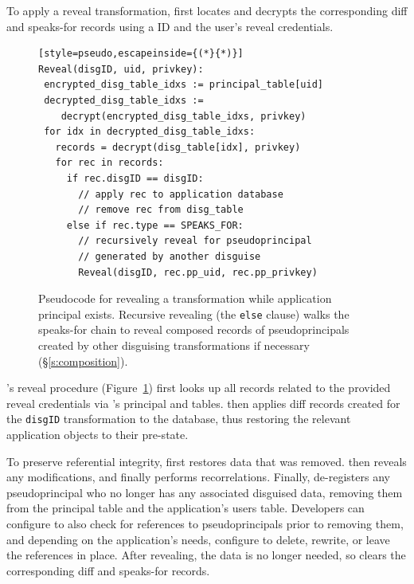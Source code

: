 %
To apply a reveal transformation, \sys first locates and decrypts the
corresponding diff and speaks-for records using a \xx ID and the user’s reveal
credentials.
%

\begin{figure}[t]
  \small
\begin{lstlisting}[style=pseudo,escapeinside={(*}{*)}]
Reveal(disgID, uid, privkey):
 encrypted_disg_table_idxs := principal_table[uid]
 decrypted_disg_table_idxs :=
    decrypt(encrypted_disg_table_idxs, privkey)
 for idx in decrypted_disg_table_idxs:
   records = decrypt(disg_table[idx], privkey)
   for rec in records:
     if rec.disgID == disgID:
       // apply rec to application database
       // remove rec from disg_table
     else if rec.type == SPEAKS_FOR:
       // recursively reveal for pseudoprincipal
       // generated by another disguise
       Reveal(disgID, rec.pp_uid, rec.pp_privkey)
\end{lstlisting}
    \caption{Pseudocode for revealing a \xxing transformation while
    application principal  exists. Recursive revealing (the
    \texttt{\small else} clause) walks the speaks-for chain to reveal composed
    records of pseudoprincipals created by other disguising transformations
    if necessary (\S\ref{s:composition}).}
  \label{f:revealpseudo}
\end{figure}

\sys's reveal procedure (Figure~\ref{f:revealpseudo}) first looks up all \xx
records related to the provided reveal credentials via \sys's principal and \xx
tables.
%
\sys then applies diff records created for the \verb+disgID+ \xx transformation
to the database, thus restoring the relevant
application objects to their pre-\xxed state.

%
To preserve referential integrity, \sys first restores \xxed data that was
removed.
%
\sys then reveals any modifications, and finally performs recorrelations. 
%
Finally, \sys de-registers any pseudoprincipal who no longer has any associated
disguised data, removing them from the principal table and the application's
users table.
%
Developers can configure \sys to also check for references to pseudoprincipals
prior to removing them, and depending on the application's needs, configure \sys
to delete, rewrite, or leave the references in place.
%
After revealing, the \xxed data is no longer needed, so \sys clears the
corresponding diff and speaks-for records.
%

